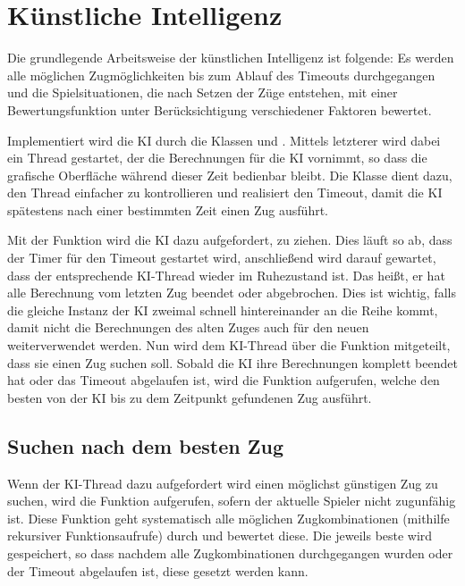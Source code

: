 \chapter{Künstliche Intelligenz}
Die grundlegende Arbeitsweise der künstlichen Intelligenz ist folgende: Es werden alle möglichen Zugmöglichkeiten bis zum Ablauf des Timeouts durchgegangen und die Spielsituationen, die nach Setzen der Züge entstehen, mit einer Bewertungsfunktion unter Berücksichtigung verschiedener Faktoren bewertet.

Implementiert wird die KI durch die Klassen  und . Mittels letzterer wird dabei ein Thread gestartet, der die Berechnungen für die KI vornimmt, so dass die grafische Oberfläche während dieser Zeit bedienbar bleibt. Die Klasse  dient dazu, den Thread einfacher zu kontrollieren und realisiert den Timeout, damit die KI spätestens nach einer bestimmten Zeit einen Zug ausführt.

Mit der Funktion  wird die KI dazu aufgefordert, zu ziehen. Dies läuft so ab, dass der Timer für den Timeout gestartet wird, anschließend wird darauf gewartet, dass der entsprechende KI-Thread  wieder im Ruhezustand ist. Das heißt, er hat alle Berechnung vom letzten Zug beendet oder abgebrochen. Dies ist wichtig, falls die gleiche Instanz der KI zweimal schnell hintereinander an die Reihe kommt, damit nicht die Berechnungen des alten Zuges auch für den neuen weiterverwendet werden. Nun wird dem KI-Thread über die Funktion  mitgeteilt, dass sie einen Zug suchen soll. Sobald die KI ihre Berechnungen komplett beendet hat oder das Timeout abgelaufen ist, wird die Funktion  aufgerufen, welche den besten von der KI bis zu dem Zeitpunkt gefundenen Zug ausführt.

\section{Suchen nach dem besten Zug}
Wenn der KI-Thread dazu aufgefordert wird einen möglichst günstigen Zug zu suchen, wird die Funktion  aufgerufen, sofern der aktuelle Spieler nicht zugunfähig ist. Diese Funktion geht systematisch alle möglichen Zugkombinationen (mithilfe rekursiver Funktionsaufrufe) durch und bewertet diese. Die jeweils beste wird gespeichert, so dass nachdem alle Zugkombinationen durchgegangen wurden oder der Timeout abgelaufen ist, diese gesetzt werden kann.

